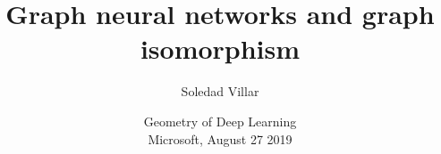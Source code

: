 \documentclass{beamer}
\begin{document}
\title{Graph neural networks and graph isomorphism}
\author{Soledad Villar}

\date{Geometry of Deep Learning \\ Microsoft, August 27 2019 }
\begin{frame}
\maketitle
\end{frame}



%
%
%
\end{document}
